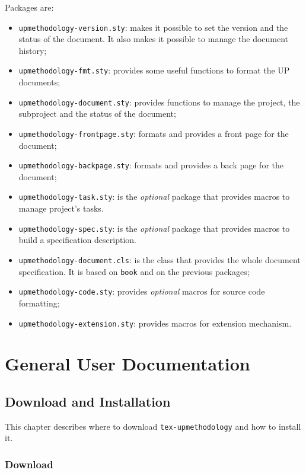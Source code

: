 \documentclass[book,taskpackage,specpackage,codepackage]{upmethodology-document}
\begin{document}
Packages are:
\begin{itemize}
\item \texttt{upmethodology-version.sty}: makes it possible to set the version and the status of the document. It also makes it possible to manage the document history;
\item \texttt{upmethodology-fmt.sty}: provides some useful functions to format the UP documents;
\item \texttt{upmethodology-document.sty}: provides functions to manage the project, the subproject and the status of the document;
\item \texttt{upmethodology-frontpage.sty}: formats and provides a front page for the document;
\item \texttt{upmethodology-backpage.sty}: formats and provides a back page for the document;
\item \texttt{upmethodology-task.sty}: is the \emph{optional} \LaTeXe\xspace package that provides macros to manage project's tasks.
\item \texttt{upmethodology-spec.sty}: is the \emph{optional} \LaTeXe\xspace package that provides macros to build a specification description.
\item \texttt{upmethodology-document.cls}: is the \LaTeXe\xspace class that provides the whole document specification. It is based on \texttt{book} and on the previous packages;
\item \texttt{upmethodology-code.sty}: provides \emph{optional} macros for source code formatting;
\item \texttt{upmethodology-extension.sty}: provides macros for extension mechanism.
\end{itemize}


\part{General User Documentation}

\chapter{Download and Installation}

This chapter describes where to download \texttt{tex-upmethodology} and how to install it.

\section{Download}
\end{document}
